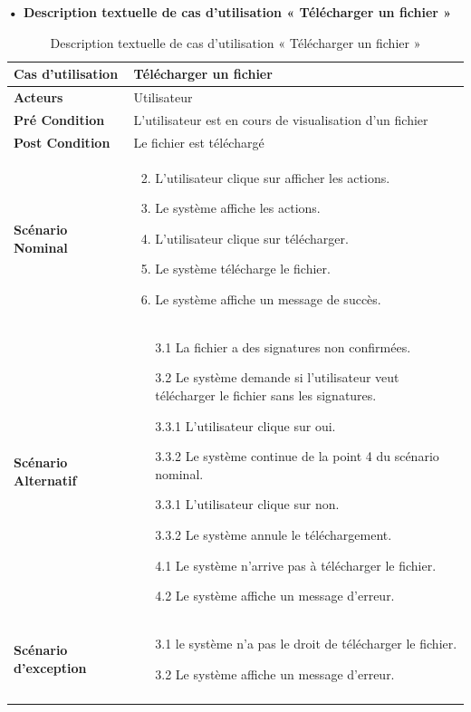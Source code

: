 \textbf{•	Description textuelle de cas d'utilisation « Télécharger un fichier »}
\begin{longtable}{|p{5cm}|p{10cm}|}
\hline
\textbf{Cas d'utilisation}&Télécharger un fichier\\
\hline
\textbf{Acteurs}&Utilisateur\\
\hline
\textbf{Pré Condition}&L'utilisateur est en cours de visualisation d'un fichier\\
\hline
\textbf{Post Condition}&Le fichier est téléchargé\\
\hline
\textbf{Scénario Nominal}&
\vspace{-\baselineskip}
\begin{enumerate}
    \setcounter{enumi}{1}
  \item L'utilisateur clique sur afficher les actions.
  \item Le système affiche les actions.
  \item L'utilisateur clique sur télécharger.
  \item Le système télécharge le fichier.
  \item Le système affiche un message de succès.
\end{enumerate}\\
\hline
\textbf{Scénario Alternatif}&
\vspace{-\baselineskip}
\begin{enumerate}
  \item [3.1] La fichier a des signatures non confirmées.
  \item [3.2] Le système demande si l'utilisateur veut télécharger le fichier sans les signatures.
  \item [3.3.1] L'utilisateur clique sur oui.
  \item [3.3.2] Le système continue de la point 4 du scénario nominal.
  \item [3.3.1] L'utilisateur clique sur non.
  \item [3.3.2] Le système annule le téléchargement.
  \item [4.1] Le système n'arrive pas à télécharger le fichier.
  \item [4.2] Le système affiche un message d'erreur.

\end{enumerate}\\
\hline
\textbf{Scénario d'exception}&
\vspace{-\baselineskip}
\begin{enumerate}
  \item [3.1] le système n'a pas le droit de télécharger le fichier.
  \item [3.2] Le système affiche un message d'erreur.
\end{enumerate}\\
\hline
\caption{Description textuelle de cas d'utilisation « Télécharger un fichier »}
\label{tab:description-textuelle-de-cas-d-utilisation-telecharger-un-fichier}
\end{longtable}


